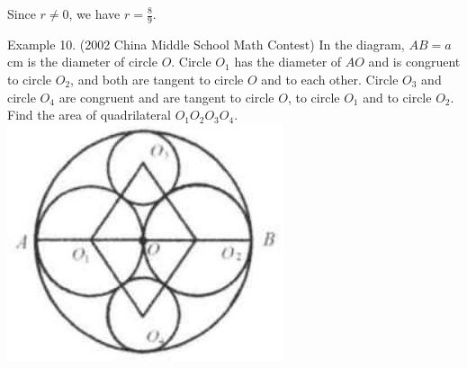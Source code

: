 \documentclass[10pt]{article}
\begin{document}
Since \(r \neq 0\), we have \(r=\frac{8}{9}\).


Example 10. (2002 China Middle School Math Contest) In the diagram, \(A B=a\) cm is the diameter of circle \(O\). Circle \(O_{1}\) has the diameter of \(A O\) and is congruent to circle \(O_{2}\), and both are tangent to circle \(O\) and to each other. Circle \(O_{3}\) and circle \(O_{4}\) are congruent and are tangent to circle \(O\), to circle \(O_{1}\) and to circle \(O_{2}\). Find the area of quadrilateral \(O_{1} O_{2} O_{3} O_{4}\).\\
\includegraphics[max width=\textwidth, center]{2025_04_17_97bc1f7e44d93c271a88g-182}
\end{document}
